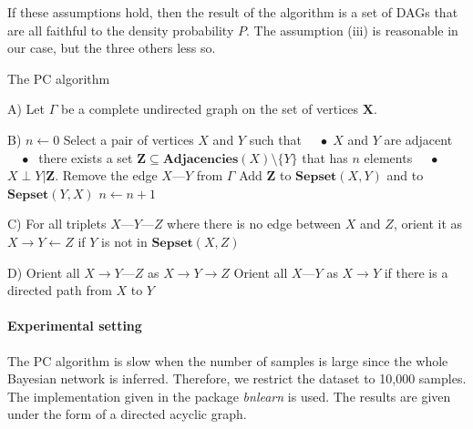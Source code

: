 If these assumptions hold, then the result of the algorithm is a set of DAGs
that are all faithful to the density probability $P$. The assumption (iii) is
reasonable in our case, but the three others less so.

\begin{algorithm}
    \caption{The PC algorithm}
    \label{alg:pc}
    \begin{algorithmic}
        \State A) Let $\Gamma$ be a complete undirected graph on the set of
        vertices $\bm X$.

        \State B) $n\gets 0$
        \Repeat
            \Repeat
                \State Select a pair of vertices $X$ and $Y$ such that
                \State $\quad\bullet\;X$ and $Y$ are adjacent
                \State $\quad\bullet\;$ there exists a set $\bm
                Z\subseteq\textbf{Adjacencies}(X)\setminus \{Y\}$ that has $n$
                elements
                \State $\quad\bullet\;$ $X\perp Y|\bm Z$.
                \State Remove the edge $X \text{---} Y$ from $\Gamma$
                \State Add $\bm Z$ to $\textbf{Sepset}(X, Y)$ and to $\textbf{Sepset}(Y, X)$
            \State $n\gets n+1$

        \State C) For all triplets $X \text{---} Y \text{---} Z$ where there is
        no edge between $X$ and $Z$, orient it as $X\rightarrow Y \leftarrow Z$
        if $Y$ is not in $\textbf{Sepset}(X, Z)$

        \State D)
        \Repeat
            \State Orient all $X\rightarrow Y\text{---} Z$ as $X\rightarrow Y
            \rightarrow Z$
            \State Orient all $X\text{---}Y$ as $X\rightarrow Y$ if there is
            a directed path from $X$ to $Y$
    \end{algorithmic}
\end{algorithm}

\paragraph{Experimental setting} The PC algorithm is slow when the number of
samples is large since the whole Bayesian network is inferred. Therefore, we
restrict the dataset to 10,000 samples. The implementation given in the package
\emph{bnlearn} is used. The results are given under the form of a directed
acyclic graph.

